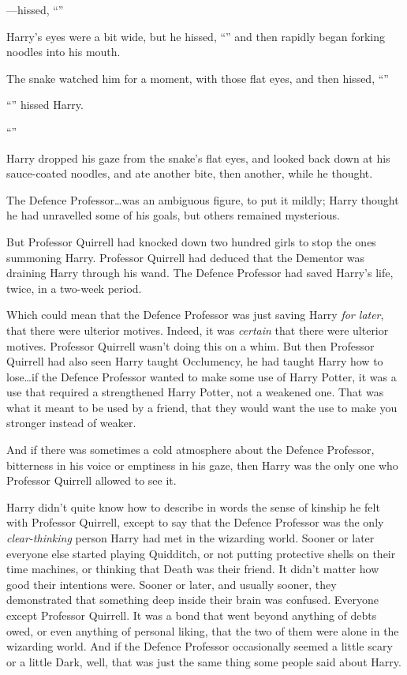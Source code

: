 —hissed, “”

Harry’s eyes were a bit wide, but he hissed, “” and then rapidly began forking noodles into his mouth.

The snake watched him for a moment, with those flat eyes, and then hissed, “”

“” hissed Harry.

“”

Harry dropped his gaze from the snake’s flat eyes, and looked back down at his sauce-coated noodles, and ate another bite, then another, while he thought.

The Defence Professor…was an ambiguous figure, to put it mildly; Harry thought he had unravelled some of his goals, but others remained mysterious.

But Professor Quirrell had knocked down two hundred girls to stop the ones summoning Harry. Professor Quirrell had deduced that the Dementor was draining Harry through his wand. The Defence Professor had saved Harry’s life, twice, in a two-week period.

Which could mean that the Defence Professor was just saving Harry \emph{for later}, that there were ulterior motives. Indeed, it was \emph{certain} that there were ulterior motives. Professor Quirrell wasn’t doing this on a whim. But then Professor Quirrell had also seen Harry taught Occlumency, he had taught Harry how to lose…if the Defence Professor wanted to make some use of Harry Potter, it was a use that required a strengthened Harry Potter, not a weakened one. That was what it meant to be used by a friend, that they would want the use to make you stronger instead of weaker.

And if there was sometimes a cold atmosphere about the Defence Professor, bitterness in his voice or emptiness in his gaze, then Harry was the only one who Professor Quirrell allowed to see it.

Harry didn’t quite know how to describe in words the sense of kinship he felt with Professor Quirrell, except to say that the Defence Professor was the only \emph{clear-thinking} person Harry had met in the wizarding world. Sooner or later everyone else started playing Quidditch, or not putting protective shells on their time machines, or thinking that Death was their friend. It didn’t matter how good their intentions were. Sooner or later, and usually sooner, they demonstrated that something deep inside their brain was confused. Everyone except Professor Quirrell. It was a bond that went beyond anything of debts owed, or even anything of personal liking, that the two of them were alone in the wizarding world. And if the Defence Professor occasionally seemed a little scary or a little Dark, well, that was just the same thing some people said about Harry.

